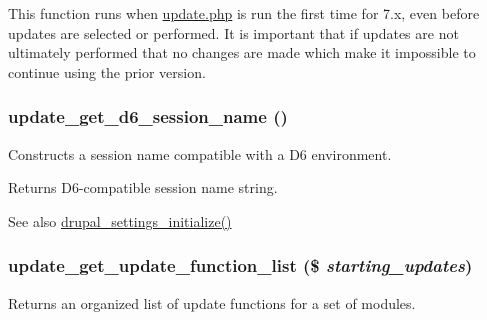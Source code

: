 This function runs when \hyperlink{update_8php}{update.php} is run the first time for 7.x, even before updates are selected or performed. It is important that if updates are not ultimately performed that no changes are made which make it impossible to continue using the prior version. \hypertarget{update_8inc_a1e41248922d100f2412b8471c05c59be}{
\subsubsection[{update\_\-get\_\-d6\_\-session\_\-name}]{\setlength{\rightskip}{0pt plus 5cm}update\_\-get\_\-d6\_\-session\_\-name ()}}
\label{update_8inc_a1e41248922d100f2412b8471c05c59be}
Constructs a session name compatible with a D6 environment.

\begin{DoxyReturn}{Returns}
D6-\/compatible session name string.
\end{DoxyReturn}
\begin{DoxySeeAlso}{See also}
\hyperlink{bootstrap_8inc_acae9a8501a2571219d7517f50cc6afec}{drupal\_\-settings\_\-initialize()} 
\end{DoxySeeAlso}
\hypertarget{update_8inc_ad268e1662e1d06a85f3d51dfec9955b2}{
\subsubsection[{update\_\-get\_\-update\_\-function\_\-list}]{\setlength{\rightskip}{0pt plus 5cm}update\_\-get\_\-update\_\-function\_\-list (\$ {\em starting\_\-updates})}}
\label{update_8inc_ad268e1662e1d06a85f3d51dfec9955b2}
Returns an organized list of update functions for a set of modules.


